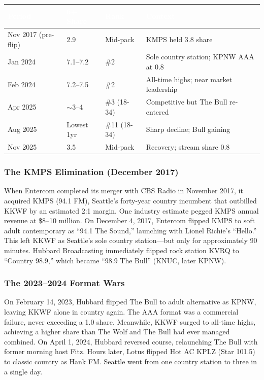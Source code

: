\documentclass[11pt,letterpaper]{article}
\newcommand{\tableheader}[1]{\textbf{\sffamily\textcolor{white}{#1}}}
\begin{document}
\begin{center}
\begin{tabularx}{\textwidth}{L{3cm}C{2cm}C{2cm}X}
\toprule
{}
\tableheader{Period} & \tableheader{6+ Share} & \tableheader{Rank} & \tableheader{Context} \\
\midrule
Nov 2017 (pre-flip) & 2.9 & Mid-pack & KMPS held 3.8 share \\
Jan 2024 & 7.1--7.2 & \#2 & Sole country station; KPNW AAA at 0.8 \\
Feb 2024 & 7.2--7.5 & \#2 & All-time highs; near market leadership \\
Apr 2025 & $\sim$3--4 & \#3 (18-34) & Competitive but The Bull re-entered \\
Aug 2025 & Lowest 1yr & \#11 (18-34) & Sharp decline; Bull gaining \\
Nov 2025 & 3.5 & Mid-pack & Recovery; stream share 0.8 \\
\bottomrule
\end{tabularx}
\end{center}

\subsubsection{The KMPS Elimination (December 2017)}

When Entercom completed its merger with CBS Radio in November 2017, it acquired KMPS (94.1 FM), Seattle's forty-year country incumbent that outbilled KKWF by an estimated 2:1 margin. One industry estimate pegged KMPS annual revenue at \$8--10 million. On December 4, 2017, Entercom flipped KMPS to soft adult contemporary as ``94.1 The Sound,'' launching with Lionel Richie's ``Hello.'' This left KKWF as Seattle's sole country station---but only for approximately 90 minutes. Hubbard Broadcasting immediately flipped rock station KVRQ to ``Country 98.9,'' which became ``98.9 The Bull'' (KNUC, later KPNW).

\subsubsection{The 2023--2024 Format Wars}

On February 14, 2023, Hubbard flipped The Bull to adult alternative as KPNW, leaving KKWF alone in country again. The AAA format was a commercial failure, never exceeding a 1.0 share. Meanwhile, KKWF surged to all-time highs, achieving a higher share than The Wolf and The Bull had ever managed combined. On April 1, 2024, Hubbard reversed course, relaunching The Bull with former morning host Fitz. Hours later, Lotus flipped Hot AC KPLZ (Star 101.5) to classic country as Hank FM. Seattle went from one country station to three in a single day.
\end{document}
